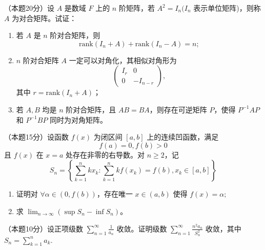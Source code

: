 \documentclass[loose]{ExBook}
\begin{document}
\begin{qitems}
    \begin{bbox}
        \qitem （本题20分）设 \( A \) 是数域 \( F \) 上的 \( n \) 阶矩阵，若 \( A^2 = I_n(I_n \) 表示单位矩阵)，则称 \( A \) 为对合矩阵。试证：
        \begin{enumerate}[label=(\arabic*)]
            \item 若 \( A \) 是 \( n \) 阶对合矩阵，则
            \[\text{rank}\left(I_n + A\right) + \text{rank}\left(I_n - A\right) = n;\]
            \item \( n \) 阶对合矩阵 \( A \) 一定可以对角化，其相似对角形为
            \[ \begin{pmatrix} I_r & 0 \\ 0 & -I_{n-r} \end{pmatrix}, \]
            其中 \( r = \text{rank} \left( I_n + A \right) \)；
            \item 若 \( A, B \) 均是 \( n \) 阶对合矩阵，且 \( AB = BA \)，则存在可逆矩阵 \( P \)，使得 \( P^{-1}AP \) 和 \( P^{-1}BP \) 同时为对角矩阵。
        \end{enumerate}
    \end{bbox}

    \begin{bbox}
        \qitem （本题15分）设函数 \( f(x) \) 为闭区间 \([a, b]\) 上的连续凹函数，满足
        \[ f(a) = 0, f(b) > 0 \]
        且 \( f(x) \) 在 \( x = a \) 处存在非零的右导数。对 \( n \geq 2 \)，记
        \[ S_n = \left\{ \sum_{k=1}^{n} kx_k : \sum_{k=1}^{n} kf(x_k) = f(b), x_k \in [a, b] \right\} \]
        \begin{enumerate}[label=(\arabic*)]
            \item 证明对 \(\forall \alpha \in (0, f(b))\)，存在唯一 \( x \in (a, b) \) 使得
            \( f(x) = \alpha; \)
            \item 求 \(\lim_{n \to \infty} (\sup S_n - \inf S_n)\)。
        \end{enumerate}
    \end{bbox}

    \begin{bbox}
        \qitem （本题10分）设正项级数
        \( \sum_{n=1}^{\infty} \frac{1}{a_n} \)
        收敛。证明级数
        \( \sum_{n=1}^{\infty} \frac{n^2 a_n}{S_n^2} \)
        收敛，其中
        \( S_n = \sum_{k=1}^{n} a_k. \)
    \end{bbox}
\end{qitems}
\end{document}
